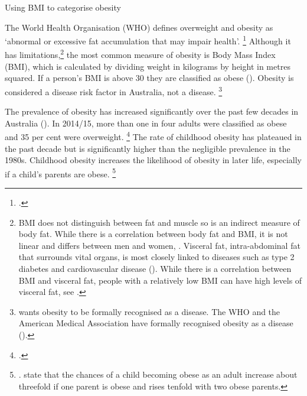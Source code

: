 \documentclass[embargoed]{grattan}
\begin{document}
\begin{table}%
\caption{Using BMI to categorise obesity}\label{tbl:using-BMI-to-categorise-obesity}



\end{table}

The World Health Organisation (WHO) defines overweight and obesity as `abnormal or excessive fat accumulation that may impair health'.%
\footcite{Organization2016ObesityoverweightFact} Although it has limitations,\footnote{BMI does not distinguish between fat and muscle so is an indirect measure of body fat.
While there is a correlation between body fat and BMI, it is not linear and differs between men and women, \textcite{Rothman2008BMIrelatederrors}.
Visceral fat, intra-abdominal fat that surrounds vital organs, is most closely linked to diseases such as type 2 diabetes and cardiovascular disease (\textcites{Mathieu2009Visceralobesitylink}{Despres2012Bodyfatdistribution}{Janiszewski2012WhyBodyMass}).
While there is a correlation between BMI and visceral fat, people with a relatively low BMI can have high levels of visceral fat, see \textcite{Rankinen1999predictionabdominalvisceral}.} 
the most common measure of obesity is Body Mass Index (BMI), which is calculated by dividing weight in kilograms by height in metres squared.
If a person's BMI is above 30 they are classified as obese ().
Obesity is considered a disease risk factor in Australia, not a disease.%
\footnote{\textcite{Australia2014NoTimeWeight} wants obesity to be formally recognised as a disease.
The WHO and the American Medical Association have formally recognised obesity as a disease (\textcites{Organisation2000Obesitypreventingmanaging}{Stoner2014DidAmericanMedical}{Australia2015NoTimeWeight}).}



The prevalence of obesity has increased significantly over the past few decades in Australia ().
In 2014/15, more than one in four adults were classified as obese and 35 per cent were overweight.%
\footcite[][Tables 8 and 16]{ABS20154364055001NationalHealth} The rate of childhood obesity has plateaued in the past decade but is significantly higher than the negligible prevalence in the 1980s.
Childhood obesity increases the likelihood of obesity in later life, especially if a child's parents are obese.%
\footnote{\textcites{Health2013AustralianDietaryGuidelines}{Baker2007Childhoodbodymass}{Popkin2004nutritiontransitionworldwide}{Summerbell2005Interventionspreventingobesity}. \textcite{Sobko2011randomisedcontrolledtrial} state that the chances of a child becoming obese as an adult increase about threefold if one parent is obese and rises tenfold with two obese parents.}
\end{document}
